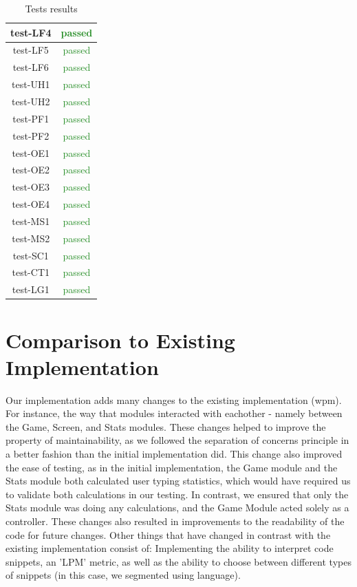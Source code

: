 \documentclass[12pt, titlepage]{article}
\begin{document}
\begin{table}[H]
\begin{tabular}{|c|c|}
test-LF4 & \textcolor{ForestGreen}{passed} \\ \hline
test-LF5 & \textcolor{ForestGreen}{passed} \\ \hline
test-LF6 & \textcolor{ForestGreen}{passed} \\ \hline
test-UH1 & \textcolor{ForestGreen}{passed} \\ \hline
test-UH2 & \textcolor{ForestGreen}{passed} \\ \hline
test-PF1 & \textcolor{ForestGreen}{passed} \\ \hline
test-PF2 & \textcolor{ForestGreen}{passed} \\ \hline
test-OE1 & \textcolor{ForestGreen}{passed} \\ \hline
test-OE2 & \textcolor{ForestGreen}{passed} \\ \hline
test-OE3 & \textcolor{ForestGreen}{passed} \\ \hline
test-OE4 & \textcolor{ForestGreen}{passed} \\ \hline
test-MS1 & \textcolor{ForestGreen}{passed} \\ \hline
test-MS2 & \textcolor{ForestGreen}{passed} \\ \hline
test-SC1 & \textcolor{ForestGreen}{passed} \\ \hline
test-CT1 & \textcolor{ForestGreen}{passed} \\ \hline
test-LG1 & \textcolor{ForestGreen}{passed} \\ \hline
\end{tabular}
    \caption{Tests results}
    \label{tab:nfrtrace}
\end{table}

\newpage
\section{Comparison to Existing Implementation}
Our implementation adds many changes to the existing implementation (wpm). For instance, the way that modules interacted with eachother - namely between the Game, Screen, and Stats modules. These changes helped to improve the property of maintainability, as we followed the separation of concerns principle in a better fashion than the initial implementation did. This change also improved the ease of testing, as in the initial implementation, the Game module and the Stats module both calculated user typing statistics, which would have required us to validate both calculations in our testing. In contrast, we ensured that only the Stats module was doing any calculations, and the Game Module acted solely as a controller. These changes also resulted in improvements to the readability of the code for future changes. Other things that have changed in contrast with the existing implementation consist of: Implementing the ability to interpret code snippets, an 'LPM' metric, as well as the ability to choose between different types of snippets (in this case, we segmented using language). \\
\end{document}

